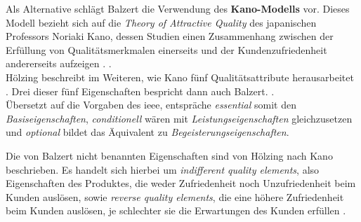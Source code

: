 Als Alternative schlägt Balzert die Verwendung des \textbf{Kano-Modells} vor. Dieses Modell bezieht sich auf die \textit{Theory of Attractive Quality} des japanischen Professors Noriaki Kano, dessen Studien einen Zusammenhang zwischen der Erfüllung von Qualitätsmerkmalen einerseits und der Kundenzufriedenheit andererseits aufzeigen \citep[vgl.][77]{Hoelzing2008}.  \citep[][78]{Hoelzing2008}. \\
Hölzing beschreibt im Weiteren, wie Kano fünf Qualitätsattribute herausarbeitet \citep[vgl.][82]{Hoelzing2008}. Drei dieser fünf Eigenschaften bespricht dann auch Balzert.
 \citep[][544]{Balzert2010}.\\
Übersetzt auf die Vorgaben des \ac{ieee}, entspräche \textit{essential} somit den \textit{Basiseigenschaften}, \textit{conditionell} wären mit \textit{Leistungseigenschaften} gleichzusetzen und \textit{optional} bildet das Äquivalent zu \textit{Begeisterungseigenschaften}.

Die von Balzert nicht benannten Eigenschaften sind von Hölzing nach Kano beschrieben. Es handelt sich hierbei um \textit{indifferent quality elements}, also Eigenschaften des Produktes, die weder Zufriedenheit noch Unzufriedenheit beim Kunden auslösen, sowie \textit{reverse quality elements}, die eine höhere Zufriedenheit beim Kunden auslösen, je schlechter sie die Erwartungen des Kunden erfüllen \citep[vgl.][83]{Hoelzing2008}.

